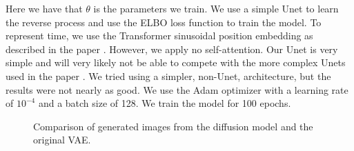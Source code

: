 Here we have that $\theta$ is the parameters we train. We use a simple Unet to learn the reverse process and use the ELBO loss function to train the model. To represent time, we use the Transformer sinusoidal position embedding as described in the paper \cite{diffusion}. However, we apply no self-attention. Our Unet is very simple and will very likely not be able to compete with the more complex Unets used in the paper \cite{diffusion}. We tried using a simpler, non-Unet, architecture, but the results were not nearly as good. We use the Adam optimizer with a learning rate of $10^{-4}$ and a batch size of 128. We train the model for 100 epochs.

\begin{figure}[h]
    \centering
    \setlength{\belowcaptionskip}{-10pt}
    \caption{Comparison of generated images from the diffusion model and the original VAE.}
    \label{fig:example}%
\end{figure}

